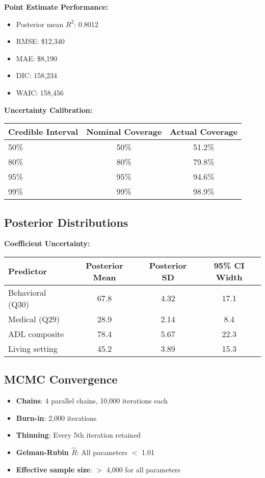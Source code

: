 \textbf{Point Estimate Performance:}
\begin{itemize}
    \item Posterior mean $R^2$: 0.8012
    \item RMSE: \$12,340
    \item MAE: \$8,190
    \item DIC: 158,234
    \item WAIC: 158,456
\end{itemize}

\textbf{Uncertainty Calibration:}
\begin{center}
\begin{tabular}{lcc}
\toprule
Credible Interval & Nominal Coverage & Actual Coverage \\
\midrule
50\% & 50\% & 51.2\% \\
80\% & 80\% & 79.8\% \\
95\% & 95\% & 94.6\% \\
99\% & 99\% & 98.9\% \\
\bottomrule
\end{tabular}
\end{center}

\subsection{Posterior Distributions}

\textbf{Coefficient Uncertainty:}
\begin{center}
\begin{tabular}{lccc}
\toprule
Predictor & Posterior Mean & Posterior SD & 95\% CI Width \\
\midrule
Behavioral (Q30) & 67.8 & 4.32 & 17.1 \\
Medical (Q29) & 28.9 & 2.14 & 8.4 \\
ADL composite & 78.4 & 5.67 & 22.3 \\
Living setting & 45.2 & 3.89 & 15.3 \\
\bottomrule
\end{tabular}
\end{center}

\subsection{MCMC Convergence}

\begin{itemize}
    \item \textbf{Chains}: 4 parallel chains, 10,000 iterations each
    \item \textbf{Burn-in}: 2,000 iterations
    \item \textbf{Thinning}: Every 5th iteration retained
    \item \textbf{Gelman-Rubin $\hat{R}$}: All parameters $<$ 1.01
    \item \textbf{Effective sample size}: $>$ 4,000 for all parameters
\end{itemize}

